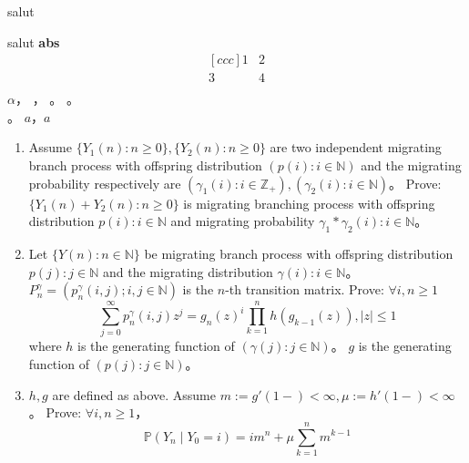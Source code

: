 \documentclass{ctexart}
\newif\ifpreface
\begin{document}
\large
\setlength{\baselineskip}{1.2em}
\ifpreface

\else
\fi
{}
salut

salut
\textbf{abs}
\[
  \begin{matrix}[ccc]
    1 & 2 \\
    3 & 4 \\
  \end{matrix}
\]
\(\alpha\)\nolinebreak[4]，
，
。
。
\begin{equation}

\end{equation}。
\(a\)\nolinebreak[4]，\(a\)
\begin{problem}\label{pro:1}
  \begin{enumerate}
    \item Assume \(\{Y_1(n):n \geq 0\}, \{Y_2(n):n \geq 0\}\) are two independent migrating branch process with offspring distribution
      \((p(i):i \in \mathbb{N})\) and the migrating probability respectively are \((\gamma_1(i): i \in \mathbb{Z}_{+}),(\gamma_2(i): i \in \mathbb{N})\)\nolinebreak[4]。
      Prove: \(\{Y_1(n )+ Y_2(n): n \geq 0\}\) is migrating branching process with offspring distribution \(p(i): i \in \mathbb{N}\)
      and migrating probability \(\gamma_1 * \gamma_2(i): i \in \mathbb{N}\)\nolinebreak[4]。
    \item Let \(\{Y(n): n \in \mathbb{N}\}\) be migrating branch process with offspring distribution \(p(j): j \in \mathbb{N}\)
      and the migrating distribution \(\gamma(i): i \in \mathbb{N}\)\nolinebreak[4]。
      \(P_n^\gamma=(p_n^\gamma (i,j); i,j \in \mathbb{N})\) is the \(n\)-th transition matrix.
      Prove: \(\forall i,n \geq 1\)
      \[
        \sum_{j=0}^{\infty} p_n^\gamma(i,j)z^j = g_n(z)^i \prod_{k=1}^{n} h(g_{k-1}(z)), |z| \leq 1
      \]
      where \(h\) is the generating function of \((\gamma(j): j \in \mathbb{N})\)\nolinebreak[4]。
      \(g\) is the generating function of \((p(j): j \in \mathbb{N})\)\nolinebreak[4]。
    \item \(h,g\) are defined as above. Assume \(m :=g'(1-) < \infty, \mu:=h'(1-) < \infty\)\nolinebreak[4]。
      Prove: \(\forall i,n \geq 1\)\nolinebreak[4]，\[
        \mathbb{P}(Y_n \mid Y_0 =i)=im^n + \mu \sum_{k=1}^{n} m^{k-1}
      \]
  \end{enumerate}
\end{problem}
\end{document}
